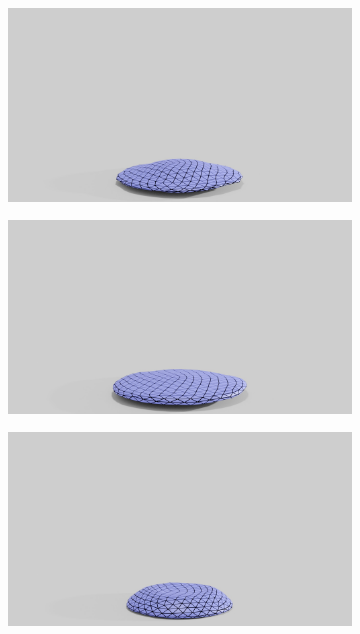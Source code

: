 \begin{figure}
\begin{subfigure}{.16\linewidth}
		\label{sfig:ball-vc-1}
	\end{subfigure}%
	\begin{subfigure}{.16\linewidth}
		\centering
		{\includegraphics[width=2.0\textwidth]{images/coarse_ball/vp/0250.jpg}}
		\label{sfig:ball-vc-2}
	\end{subfigure}%
	\begin{subfigure}{.16\linewidth}
		\centering
		{\includegraphics[width=2.0\textwidth]{images/coarse_ball/vp/0300.jpg}}
		\label{sfig:ball-vc-3}
	\end{subfigure}%
	\begin{subfigure}{.16\linewidth}
		\centering
		{\includegraphics[width=2.0\textwidth]{images/coarse_ball/vp/0350.jpg}}

\end{subfigure}
\end{figure}
